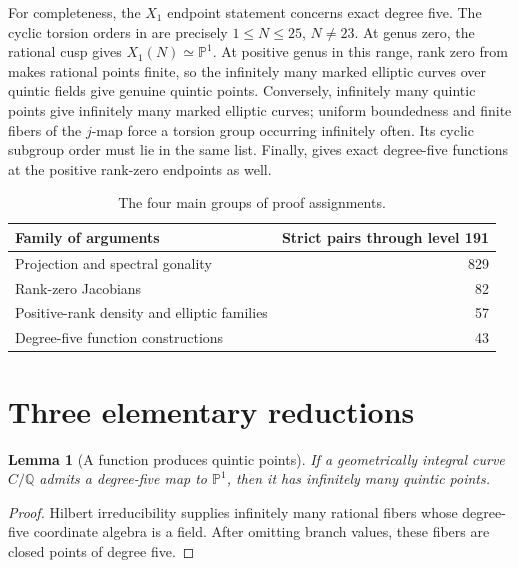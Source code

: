 \documentclass[11pt]{article}
\newcommand{\Q}{\mathbb Q}
\newcommand{\PP}{\mathbb P}
\newtheorem{lemma}[theorem]{Lemma}
\theoremstyle{remark}\newtheorem{remark}[theorem]{Remark}
\begin{document}
For completeness, the $X_1$ endpoint statement concerns exact degree five.
The cyclic torsion orders in \cite[Theorem 1.1]{DS} are precisely
$1\le N\le25$, $N\ne23$. At genus zero, the rational cusp gives
$X_1(N)\simeq\PP^1$. At positive genus in this range, rank zero from
\cite[Theorem 4.1]{DS} makes rational points finite, so the infinitely
many marked elliptic curves over quintic fields give genuine quintic
points. Conversely, infinitely many quintic points give infinitely many
marked elliptic curves; uniform boundedness and finite fibers of the
$j$-map force a torsion group occurring infinitely often. Its cyclic
subgroup order must lie in the same list. Finally,
\cite[Corollary 2.4]{DS} gives exact degree-five functions at the positive
rank-zero endpoints as well.

\begin{table}[ht]
\centering
\begin{tabular}{lr}\toprule
Family of arguments & Strict pairs through level 191\\\midrule
Projection and spectral gonality &829\\
Rank-zero Jacobians &82\\
Positive-rank density and elliptic families &57\\
Degree-five function constructions &43\\\bottomrule
\end{tabular}
\caption{The four main groups of proof assignments.}
\end{table}

\section{Three elementary reductions}
\begin{lemma}[A function produces quintic points]
If a geometrically integral curve $C/\Q$ admits a degree-five map to
$\PP^1$, then it has infinitely many quintic points.
\end{lemma}
\begin{proof}
Hilbert irreducibility supplies infinitely many rational fibers whose
degree-five coordinate algebra is a field. After omitting branch values,
these fibers are closed points of degree five.
\end{proof}
\end{document}
